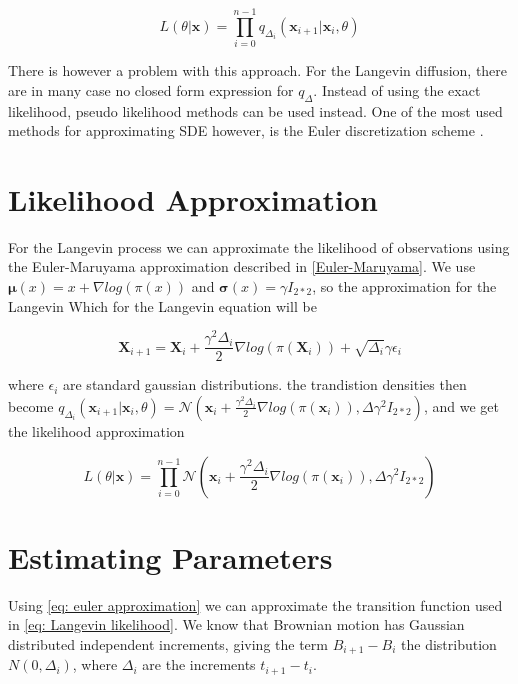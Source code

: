 \begin{equation}
    L(\theta | \textbf{x}) = \prod_{i=0}^{n-1} q_{\Delta_i}(\textbf{x}_{i+1} | \textbf{x}_i, \theta)
    \label{eq: Langevin likelihood}
\end{equation}

There is however a problem with this approach. For the Langevin diffusion, there are in many case no closed form expression for $q_\Delta$\cite{gloaguen_stochastic_2018}. Instead of using the exact likelihood, pseudo likelihood methods can be used instead. One of the most used methods for approximating SDE however, is the Euler discretization scheme \cite{iacus_simulation_2008}.







\section{Likelihood Approximation}
For the Langevin process we can approximate the likelihood of observations using the Euler-Maruyama approximation described in \ref{Euler-Maruyama}. We use $\pmb{\mu}(x) = x + \nabla log(\pi(x))$ and $\pmb{\sigma}(x) = \gamma I_{2*2}$, so the approximation for the Langevin Which for the Langevin equation will be 

$$
    \textbf{X}_{i+1} = \textbf{X}_i + \frac{\gamma^2 \Delta_i}{2}\nabla log(\pi(\textbf{X}_i)) + \sqrt{\Delta_i}\gamma \epsilon_i
$$

where $\epsilon_i$ are standard gaussian distributions. the trandistion densities then become $q_{\Delta_i}(\textbf{x}_{i+1} | \textbf{x}_i, \theta) = \mathcal{N}(\textbf{x}_i + \frac{\gamma^2 \Delta_i}{2}\nabla log(\pi(\textbf{x}_i)), \Delta \gamma^2 I_{2*2})$, and we get the likelihood approximation

$$L(\theta | \textbf{x}) = \prod_{i=0}^{n-1} \mathcal{N}(\textbf{x}_i + \frac{\gamma^2 \Delta_i}{2}\nabla log(\pi(\textbf{x}_i)), \Delta \gamma^2 I_{2*2})$$







\section{Estimating Parameters}
Using \ref{eq: euler approximation} we can approximate the transition function used in \ref{eq: Langevin likelihood}. We know that Brownian motion has Gaussian distributed independent increments, giving the term $B_{i+1} - B_i$ the distribution $N(0, \Delta_i)$, where $\Delta_i$ are the increments $t_{i+1} - t_i$. 

